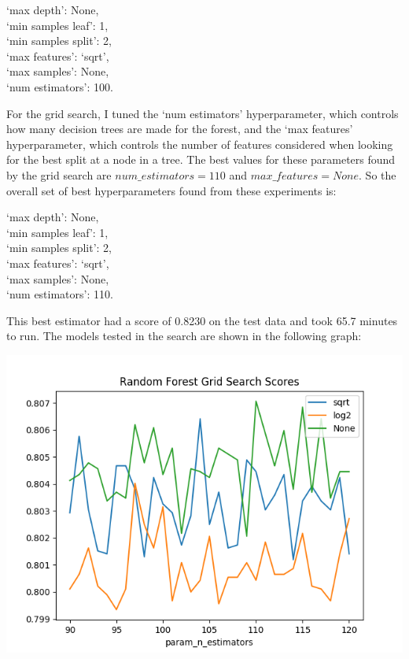 \documentclass{article}
\begin{document}
\begin{center}
 `max depth': None, 
 \\`min samples leaf': 1, 
 \\`min samples split': 2, 
 \\`max features': `sqrt', 
 \\`max samples': None, 
 \\`num estimators': 100. 
 \end{center}
\bigskip For the grid search, I tuned the `num estimators' hyperparameter, which controls how many decision trees are made for the forest, and the `max features' hyperparameter, which controls the number of features considered when looking for the best split at a node in a tree. The best values for these parameters found by the grid search are $num\_estimators=110$ and $max\_features=None$.
So the overall set of best hyperparameters found from these experiments is:
\begin{center}
	 `max depth': None, 
	 \\`min samples leaf': 1, 
 	\\`min samples split': 2, 
	 \\`max features': `sqrt', 
 	\\`max samples': None, 
	 \\`num estimators': 110. 
 \end{center}
 This best estimator had a score of 0.8230 on the test data and took 65.7 minutes to run. The models tested in the search are shown in the following graph:
 \begin{center}
 	\includegraphics[scale=.7]{RandomForestGridSearch.png}
 \end{center}
\end{document}
